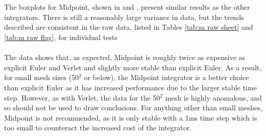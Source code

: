 \\\\The boxplots for Midpoint, shown in  and , present similar results as the other integrators. There is still a reasonably large variance in data, but the trends described are consistent in the raw data, listed in Tables \ref{tab:m raw sheet} and \ref{tab:m raw flag}, for individual tests
\\\\The data shows that, as expected, Midpoint is roughly twice as expensive as explicit Euler and Verlet and slightly more stable than explicit Euler. As a result, for small mesh sizes (50$^{2}$ or below), the Midpoint integrator is a better choice than explicit Euler as it has increased performance due to the larger stable time step. However, as with Verlet, the data for the 50$^{2}$ mesh is highly anomalous, and so should not be used to draw conclusions. For anything other than small meshes, Midpoint is not recommended, as it is only stable with a 1ms time step which is too small to counteract the increased cost of the integrator.

